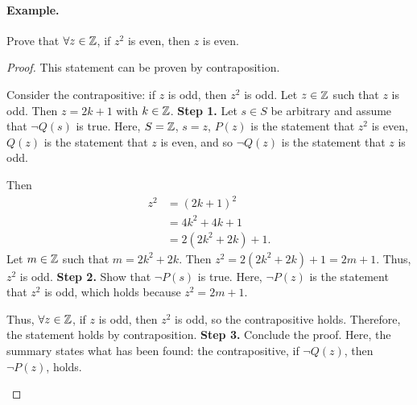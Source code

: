 \paragraph{Example.}
\begin{exercise}{
    Prove that $\forall z \in \mathbb{Z}$, if $z^2$ is even, then $z$ is even.
}
\end{exercise}
\begin{proof}{
    This statement can be proven by contraposition.

    \begin{annotatedpanel}[Setup.]{
        Consider the contrapositive: if $z$ is odd, then $z^2$ is odd. %
        Let $z \in \mathbb{Z}$ such that $z$ is odd. %
        Then $z = 2k + 1$ with $k \in \mathbb{Z}$.
    }{
        \textbf{Step 1.} Let $s \in S$ be arbitrary and assume that %
        $\neg Q(s)$ is true. %
        Here, $S = \mathbb{Z}$, $s = z$, $P(z)$ is the statement that $z^2$ is even, %
        $Q(z)$ is the statement that $z$ is even, %
        and so $\neg Q(z)$ is the statement that $z$ is odd.
    }
    \end{annotatedpanel}

    \begin{annotatedpanel}[Verification.]{
        Then %
        \begin{align*}
            z^2 &= (2k + 1)^2\\
                &= 4k^2 + 4k + 1\\
                &= 2(2k^2 + 2k) + 1.
        \end{align*}
        Let $m \in \mathbb{Z}$ such that $m = 2k^2 + 2k$. %
        Then $z^2 = 2(2k^2 + 2k) + 1 = 2m + 1$. %
        Thus, $z^2$ is odd.
    }{
        \textbf{Step 2.} Show that $\neg P(s)$ is true. %
        Here, $\neg P(z)$ is the statement that $z^2$ is odd, %
        which holds because $z^2 = 2m + 1$.
    }
    \end{annotatedpanel}

    \begin{annotatedpanel}[Conclusion.]{
        Thus, $\forall z \in \mathbb{Z}$, if $z$ is odd, then $z^2$ is odd, %
        so the contrapositive holds. %
        Therefore, the statement holds by contraposition. \qedhere
    }{
        \textbf{Step 3.} Conclude the proof. %
        Here, the summary states what has been found: %
        the contrapositive, if $\neg Q(z)$, then $\neg P(z)$, holds.
    }
    \end{annotatedpanel}
}
\end{proof}